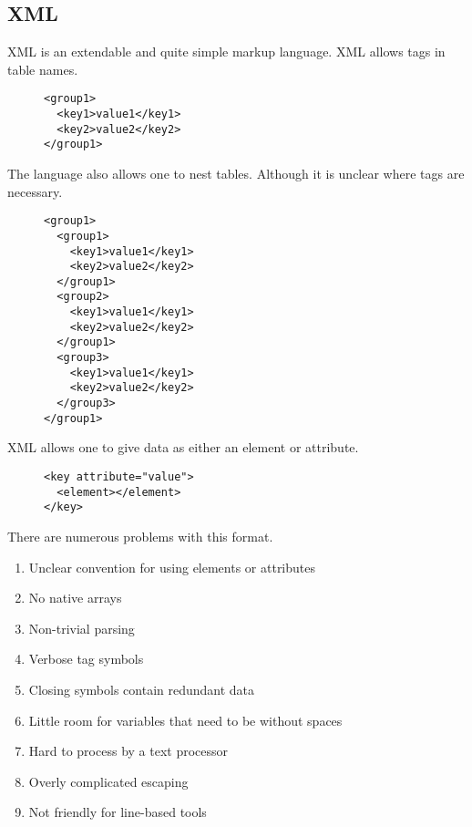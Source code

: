 \documentclass[listof=totoc]{article}
\begin{document}
\subsection{XML}
\noindent XML is an extendable and quite simple markup language. XML allows tags in table names.


\begin{figure}[H]
\centering
\begin{varwidth}{\linewidth}
\begin{verbatim}
<group1>
  <key1>value1</key1>
  <key2>value2</key2>
</group1>
\end{verbatim}
\end{varwidth}
\caption{}
\end{figure}

\noindent The language also allows one to nest tables. Although it is unclear where tags are necessary.


\begin{figure}[H]
\centering
\begin{varwidth}{\linewidth}
\begin{verbatim}
<group1>
  <group1>
    <key1>value1</key1>
    <key2>value2</key2>
  </group1>
  <group2>
    <key1>value1</key1>
    <key2>value2</key2>
  </group1>
  <group3>
    <key1>value1</key1>
    <key2>value2</key2>
  </group3>
</group1>
\end{verbatim}
\end{varwidth}
\caption{}
\end{figure}

\noindent XML allows one to give data as either an element or attribute.


\begin{figure}[H]
\centering
\begin{varwidth}{\linewidth}
\begin{verbatim}
<key attribute="value">
  <element></element>
</key>
\end{verbatim}
\end{varwidth}
\caption{}
\end{figure}

\noindent There are numerous problems with this format.

\begin{enumerate}
  \item Unclear convention for using elements or attributes
  \item No native arrays
  \item Non-trivial parsing
  \item Verbose tag symbols
  \item Closing symbols contain redundant data
  \item Little room for variables that need to be without spaces
  \item Hard to process by a text processor
  \item Overly complicated escaping
  \item Not friendly for line-based tools
\end{enumerate}
\end{document}
